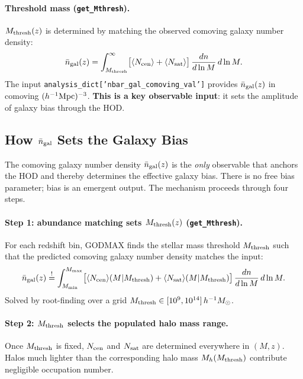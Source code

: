 \documentclass[12pt,a4paper]{article}
\newcommand{\code}[1]{\texttt{\small #1}}
\newcommand{\param}[1]{\texttt{\small #1}}
\begin{document}
\paragraph{Threshold mass (\code{get\_Mthresh}).}
$M_{\rm thresh}(z)$ is determined by matching the observed comoving galaxy
number density:
\begin{equation}
  \bar n_{\rm gal}(z) = \int_{M_{\rm thresh}}^\infty
  \bigl[\langle N_{\rm cen}\rangle+\langle N_{\rm sat}\rangle\bigr]\,
  \frac{dn}{d\ln M}\,d\ln M.
\end{equation}
The input \param{analysis\_dict['nbar\_gal\_comoving\_val']} provides
$\bar n_{\rm gal}(z)$ in comoving $(h^{-1}{\rm Mpc})^{-3}$.
\textbf{This is a key observable input}: it sets the amplitude of galaxy bias through the HOD.

\subsection{How \texorpdfstring{$\bar{n}_{\rm gal}$}{nbar\_gal} Sets the Galaxy Bias}
\label{sec:nbar_bias}

The comoving galaxy number density $\bar{n}_{\rm gal}(z)$ is the \emph{only}
observable that anchors the HOD and thereby determines the effective galaxy bias.
There is no free bias parameter; bias is an emergent output.
The mechanism proceeds through four steps.

\paragraph{Step 1: abundance matching sets $M_{\rm thresh}(z)$ (\code{get\_Mthresh}).}
For each redshift bin, GODMAX finds the stellar mass threshold $M_{\rm thresh}$
such that the predicted comoving galaxy number density matches the input:
\begin{equation}
  \bar{n}_{\rm gal}(z) \stackrel{!}{=}
  \int_{M_{\rm min}}^{M_{\rm max}}
  \bigl[\langle N_{\rm cen}\rangle(M|M_{\rm thresh})
  + \langle N_{\rm sat}\rangle(M|M_{\rm thresh})\bigr]\,
  \frac{dn}{d\ln M}\,d\ln M.
\end{equation}
Solved by root-finding over a grid $M_{\rm thresh}\in[10^9, 10^{14}]\,h^{-1}M_\odot$.

\paragraph{Step 2: $M_{\rm thresh}$ selects the populated halo mass range.}
Once $M_{\rm thresh}$ is fixed, $N_{\rm cen}$ and $N_{\rm sat}$ are determined
everywhere in $(M,z)$. Halos much lighter than the corresponding halo mass
$M_h(M_{\rm thresh})$ contribute negligible occupation number.
\end{document}
